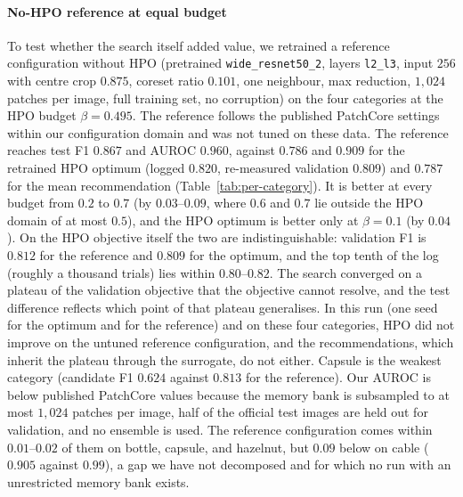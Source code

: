 \documentclass[final,5p,times,twocolumn]{elsarticle}
\begin{document}
\paragraph{No-HPO reference at equal budget}
To test whether the search itself added value, we retrained a reference
configuration without HPO (pretrained \texttt{wide\_resnet50\_2},
layers \texttt{l2\_l3}, input $256$ with centre crop $0.875$, coreset
ratio $0.101$, one neighbour, max reduction, $1{,}024$ patches per
image, full training set, no corruption) on the four categories at the HPO budget $\beta = 0.495$. The reference follows the published PatchCore settings \cite{roth_towards_2022} within our configuration domain and was not tuned on these data. The reference reaches test F1 $0.867$ and
AUROC $0.960$, against $0.786$ and $0.909$ for the retrained HPO optimum
(logged $0.820$, re-measured validation $0.809$) and $0.787$ for the mean recommendation (Table~\ref{tab:per-category}). It is better at every budget from $0.2$ to $0.7$ (by $0.03$--$0.09$, where $0.6$ and $0.7$ lie outside the HPO domain of at most $0.5$), and the HPO optimum is better only at $\beta = 0.1$ (by $0.04$). On the HPO objective itself the two
are indistinguishable: validation F1 is $0.812$ for the reference and
$0.809$ for the optimum, and the top tenth of the log (roughly a
thousand trials) lies within $0.80$--$0.82$. The search converged on a
plateau of the validation objective that the objective cannot resolve,
and the test difference reflects which point of that plateau
generalises. In this run (one seed for the optimum and for the reference) and on these four categories, HPO did not improve on the untuned reference configuration, and the recommendations, which inherit the
plateau through the surrogate, do not either. Capsule is the weakest
category (candidate F1 $0.624$ against $0.813$ for the reference). Our AUROC is below published PatchCore values because the memory bank is subsampled to at most $1{,}024$ patches per image, half of the official test images are held out for validation, and no ensemble is used. The reference configuration comes within $0.01$--$0.02$ of them on bottle, capsule, and hazelnut, but $0.09$ below on cable ($0.905$ against $0.99$), a gap we have not decomposed and for which no run with an unrestricted memory bank exists.
\end{document}
